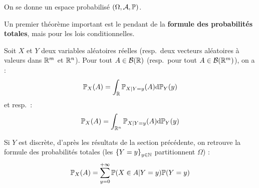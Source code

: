 \documentclass[../integ-proba.tex]{subfiles}
\begin{document}
    On se donne un espace probabilisé $\left( \Omega, \mathcal{A}, \mathbb{P} \right)$.

    Un premier théorème important est le pendant de la \textbf{formule des probabilités totales}, mais pour les lois conditionnelles.

    \begin{thm}
        Soit $X$ et $Y$ deux variables aléatoires réelles (resp.\ deux vecteurs aléatoires à valeurs dans $\mathbb{R}^m$ et $\mathbb{R}^n$).
        Pour tout $A \in \mathcal{B}(\mathbb{R})$ (resp.\ pour tout $A \in \mathcal{B}(\mathbb{R}^m)$), on a :
        \begin{displaymath}
            \mathbb{P}_X(A) = \int_{\mathbb{R}} \mathbb{P}_{X | Y = y} (A) \textnormal{d} \mathbb{P}_Y(y)
        \end{displaymath}
        et resp.\ :
        \begin{displaymath}
            \mathbb{P}_X(A) = \int_{\mathbb{R}^n} \mathbb{P}_{X | Y = y} (A) \textnormal{d} \mathbb{P}_Y(y)
        \end{displaymath}
    \end{thm}

    \begin{rem}
        Si $Y$ est discrète, d'après les résultats de la section précédente, on retrouve la formule des probabilités totales (les $\left\{ Y = y \right\}_{y \in \mathbb{N}}$ partitionnent $\Omega$) :
        \begin{displaymath}
            \mathbb{P}_X(A) = \sum_{y = 0}^{+ \infty} \mathbb{P}(X \in A | Y = y) \mathbb{P}(Y = y)
        \end{displaymath}
    \end{rem}
\end{document}
